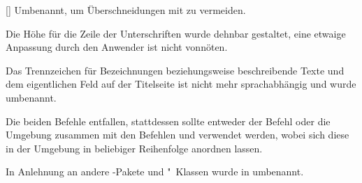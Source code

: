 \begin{Declaration}[v2.00]{[\PBoolean]}
%
Umbenannt, um Überschneidungen mit  zu vermeiden.
\end{Declaration}

\begin{Declaration}[v2.00]{}
%
Die Höhe für die Zeile der Unterschriften wurde dehnbar gestaltet, eine etwaige 
Anpassung durch den Anwender ist nicht vonnöten.
\end{Declaration}

\begin{Declaration}[v2.00]{}%
%
Das Trennzeichen für Bezeichnungen beziehungsweise beschreibende Texte und dem 
eigentlichen Feld auf der Titelseite ist nicht mehr sprachabhängig und wurde 
umbenannt.
\end{Declaration}

\begin{Declaration}[v2.00]{}
\begin{Declaration}[v2.00]{}
%
Die beiden Befehle entfallen, stattdessen sollte entweder der Befehl 
 oder die Umgebung  zusammen mit 
den Befehlen  und  verwendet werden, 
wobei sich diese in der Umgebung in beliebiger Reihenfolge anordnen lassen.
\end{Declaration}
\end{Declaration}

\begin{Declaration}[v2.00]{}{%
}
\printdeclarationlist*%
In Anlehnung an andere -Pakete und "~Klassen wurde 
 in  umbenannt.
\end{Declaration}

